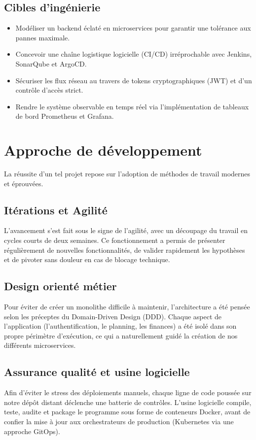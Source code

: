 \documentclass[final]{report}
\begin{document}
\subsection{Cibles d'ingénierie}
\begin{itemize}
  \item Modéliser un backend éclaté en microservices pour garantir une tolérance aux pannes maximale.
  \item Concevoir une chaîne logistique logicielle (CI/CD) irréprochable avec Jenkins, SonarQube et ArgoCD.
  \item Sécuriser les flux réseau au travers de tokens cryptographiques (JWT) et d'un contrôle d'accès strict.
  \item Rendre le système observable en temps réel via l'implémentation de tableaux de bord Prometheus et Grafana.
\end{itemize}
 
\section{Approche de développement}
La réussite d'un tel projet repose sur l'adoption de méthodes de travail modernes et éprouvées.
 
\subsection{Itérations et Agilité}
L'avancement s'est fait sous le signe de l'agilité, avec un découpage du travail en cycles courts de deux semaines. Ce fonctionnement a permis de présenter régulièrement de nouvelles fonctionnalités, de valider rapidement les hypothèses et de pivoter sans douleur en cas de blocage technique.
 
\subsection{Design orienté métier}
Pour éviter de créer un monolithe difficile à maintenir, l'architecture a été pensée selon les préceptes du Domain-Driven Design (DDD). Chaque aspect de l'application (l'authentification, le planning, les finances) a été isolé dans son propre périmètre d'exécution, ce qui a naturellement guidé la création de nos différents microservices.
 
\subsection{Assurance qualité et usine logicielle}
Afin d'éviter le stress des déploiements manuels, chaque ligne de code poussée sur notre dépôt distant déclenche une batterie de contrôles. L'usine logicielle compile, teste, audite et package le programme sous forme de conteneurs Docker, avant de confier la mise à jour aux orchestrateurs de production (Kubernetes via une approche GitOps).
 
\end{document}
